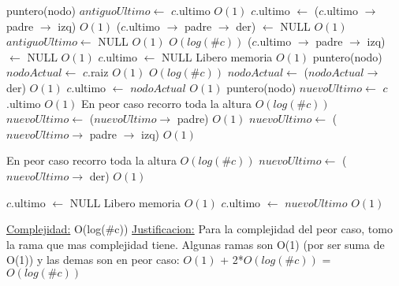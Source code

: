 \begin{Algoritmos}
\begin{algorithm}[H]
\begin{algorithmic}[1]
        \State puntero(nodo) $antiguoUltimo \gets$ $c$.ultimo \Comment $O(1)$
        \State $c$.ultimo $\gets$ ($c$.ultimo $\to$ padre $\to$ izq) \Comment $O(1)$
        \State ($c$.ultimo $\to$ padre $\to$ der) $\gets$ NULL \Comment $O(1)$
        \State $antiguoUltimo \gets$ NULL \Comment $O(1)$
    \Else
         \Comment $O(log(\#c))$
            \State ($c$.ultimo $\to$ padre $\to$ izq) $\gets$ NULL \Comment $O(1)$
            \State $c$.ultimo $\gets$ NULL \Comment Libero memoria $O(1)$
            \State puntero(nodo) $nodoActual \gets$ $c$.raiz \Comment $O(1)$
             \Comment $O(log(\#c))$
                $nodoActual \gets$ ($nodoActual \to$ der) \Comment $O(1)$
            \EndWhile
            \State $c$.ultimo $\gets$ $nodoActual$ \Comment $O(1)$
        \Else
            \State puntero(nodo) $nuevoUltimo \gets$ $c$.ultimo \Comment $O(1)$
              \Comment En peor caso recorro toda la altura $O(log(\#c))$
                \State $nuevoUltimo \gets$ ($nuevoUltimo \to$ padre) \Comment $O(1)$  
            \EndWhile
            \State $nuevoUltimo \gets$ ($nuevoUltimo \to$ padre $\to$ izq)  \Comment $O(1)$

              \Comment En peor caso recorro toda la altura  $O(log(\#c))$
                \State $nuevoUltimo \gets$ ($nuevoUltimo \to$ der) \Comment $O(1)$  
            \EndWhile

            \State $c$.ultimo $\gets$ NULL \Comment Libero memoria $O(1)$
            \State $c$.ultimo $\gets$ $nuevoUltimo$ \Comment $O(1)$

        \EndIf


    \EndIf

    \EndIf

    \medskip
    \Statex \underline{Complejidad:} O(log($\#$c))
    \Statex \underline{Justificacion:} Para la complejidad del peor caso, tomo la rama que mas complejidad tiene. Algunas ramas son O(1) (por ser suma de O(1)) y las demas son en peor caso: $O(1)$ + 2*$O(log(\#c))$ = $O(log(\#c))$

\end{algorithmic}
\end{algorithm}

$ $\newline



\end{Algoritmos}
